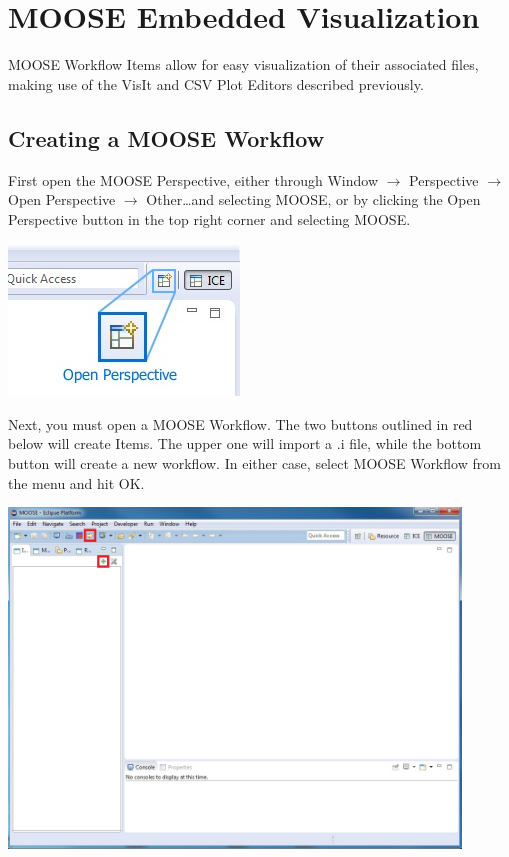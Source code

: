 \documentclass{article}
\begin{document}
\section{MOOSE Embedded Visualization}

MOOSE Workflow Items allow for easy visualization of their associated files,
making use of the VisIt and CSV Plot Editors described previously.

\subsection{Creating a MOOSE Workflow}

First open the MOOSE Perspective, either through Window $\rightarrow$
Perspective $\rightarrow$ Open Perspective $\rightarrow$ Other\ldots and
selecting MOOSE, or by clicking the Open Perspective button in the top right
corner and selecting MOOSE.

\begin{center}
\includegraphics{images/ICE_OpenPerspective}
\end{center}

Next, you must open a MOOSE Workflow. The two buttons outlined in red below will
create Items. The upper one will import a .i file, while the bottom button will
create a new workflow. In either case, select MOOSE Workflow from the menu and
hit OK.

\begin{center}
\includegraphics[width=12cm]{images/MOOSEPerspectiveNewWorkflow}
\end{center}
\end{document}
